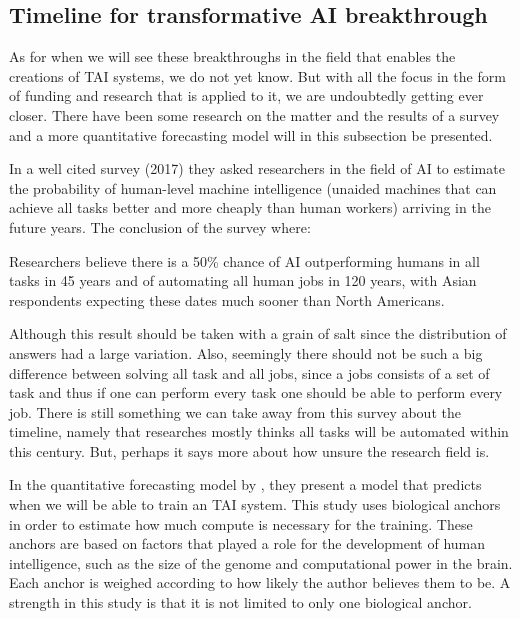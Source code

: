 \documentclass[12pt,A4]{report}
\theoremstyle{definition}
\begin{document}

\subsection{Timeline for transformative AI breakthrough}
As for when we will see these breakthroughs in the field that enables the creations of TAI systems, we do not yet know. But with all the focus in the form of funding\autocite{K'lla} and research\autocite{k'lla} that is applied to it, we are undoubtedly getting ever closer. There have been some research on the matter and the results of a survey and a more quantitative forecasting model will in this subsection be presented. 

In a well cited survey \autocite{Grace et al} (2017) they asked researchers in the field of AI to estimate the probability of human-level machine intelligence (unaided machines that can achieve all tasks better and more cheaply than human workers) arriving in the future years. The conclusion of the survey where:
\begin{displayquote}
Researchers believe there is a 50\% chance of AI outperforming humans in all tasks in 45 years and of automating all human jobs in 120 years, with Asian respondents expecting these dates much sooner than North Americans.
\end{displayquote}
Although this result should be taken with a grain of salt since the distribution of answers had a large variation. Also, seemingly there should not be such a big difference between solving all task and all jobs, since a jobs consists of a set of task and thus if one can perform every task one should be able to perform every job. There is still something we can take away from this survey about the timeline, namely that researches mostly thinks all tasks will be automated within this century. But, perhaps it says more about how unsure the research field is. 

In the quantitative forecasting model by \autocite{Ajeya Cotra}, they present a model that predicts when we will be able to train an TAI system. This study uses biological anchors in order to estimate how much compute is necessary for the training. These anchors are based on factors that played a role for the development of human intelligence, such as the size of the genome and computational power in the brain. Each anchor is weighed according to how likely the author believes them to be. A strength in this study is that it is not limited to only one biological anchor. 
\end{document}
